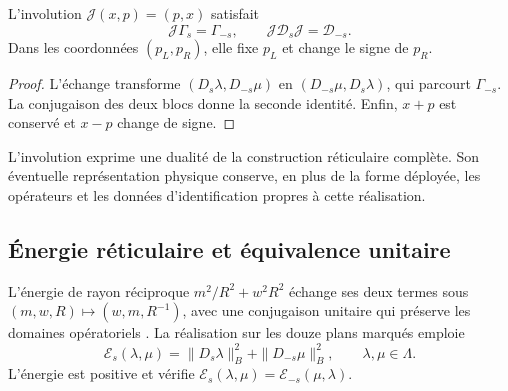 \begin{proposition}
\label{prop:leech-split-involution}
L'involution \(\mathcal J(x,p)=(p,x)\) satisfait
\[
 \mathcal J\Gamma_s=\Gamma_{-s},\qquad
 \mathcal J\mathcal D_s\mathcal J=\mathcal D_{-s}.
\]
Dans les coordonnées \((p_L,p_R)\), elle fixe \(p_L\) et change le signe de \(p_R\).
\end{proposition}
\begin{proof}
L'échange transforme \((D_s\lambda,D_{-s}\mu)\) en \((D_{-s}\mu,D_s\lambda)\), qui parcourt \(\Gamma_{-s}\). La conjugaison des deux blocs donne la seconde identité. Enfin, \(x+p\) est conservé et \(x-p\) change de signe.
\end{proof}

L’involution exprime une dualité de la construction réticulaire
complète. Son éventuelle représentation physique conserve, en plus de
la forme déployée, les opérateurs et les données d’identification
propres à cette réalisation.

\subsection{Énergie réticulaire et équivalence unitaire}
\label{subsec:leech-energy}

L'énergie de rayon réciproque \(m^2/R^2+w^2R^2\) échange ses deux termes sous \((m,w,R)\mapsto(w,m,R^{-1})\), avec une conjugaison unitaire qui préserve les domaines opératoriels \cite{HMT-IV}. La réalisation sur les douze plans marqués emploie
\begin{equation}
 \mathcal E_s(\lambda,\mu)=
       \|D_s\lambda\|_B^2+\|D_{-s}\mu\|_B^2,
 \qquad \lambda,\mu\in\Lambda.
 \label{eq:leech-energy}
\end{equation}
L’énergie est positive et vérifie
\(\mathcal E_s(\lambda,\mu)=\mathcal E_{-s}(\mu,\lambda)\).

